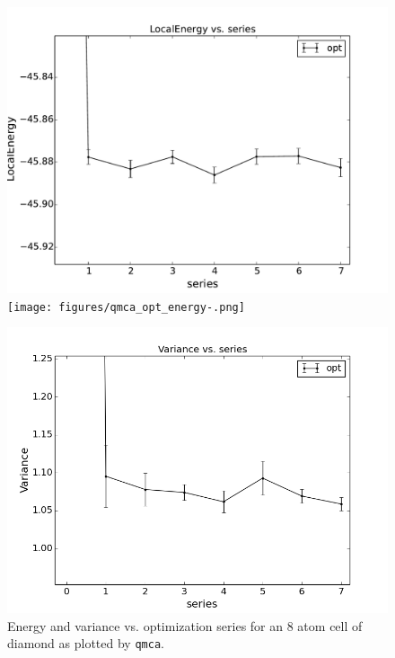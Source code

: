 \begin{figure}
  \centering
  \parbox{0.47\textwidth}{%
    \ifpdf
\includegraphics[trim=0mm 0mm 4mm 0mm,clip,width=\linewidth]{figures/qmca_opt_energy.pdf}
\else
\texttt{[image: figures/qmca\_opt\_energy-.png]}
\fi%
  }%
  \qquad
  \begin{minipage}{0.47\textwidth}%
        \includegraphics[trim=2mm 0mm 4mm 0mm,clip,width=\linewidth]{figures/qmca_opt_variance.png}%
  \end{minipage}%
  \caption{Energy and variance vs. optimization series for an 8 atom cell of diamond as plotted by \texttt{qmca}.}%
  \label{fig:qmca_opt_ev}%
\end{figure}

